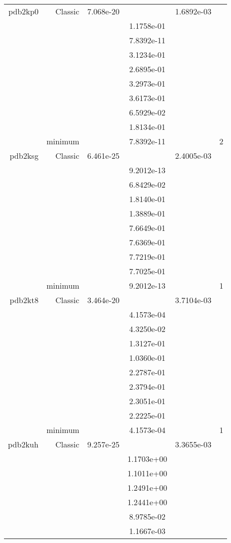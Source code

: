 \begin{xltabular}{\textwidth}{r|rS[table-format=1.3e+2]S[table-format=1.4e+2]S[table-format=1.4e+2]S[table-format=-1.5]}
pdb2kp0 & Classic & 7.068e-20 &  & 1.6892e-03 & \\
&  &  & 1.1758e-01 & & \\
&  &  & 7.8392e-11 & & \\
&  &  & 3.1234e-01 & & \\
&  &  & 2.6895e-01 & & \\
&  &  & 3.2973e-01 & & \\
&  &  & 3.6173e-01 & & \\
&  &  & 6.5929e-02 & & \\
&  &  & 1.8134e-01 & & \\
& minimum &  & 7.8392e-11 & & 2 \\  \addlinespace
pdb2ksg & Classic & 6.461e-25 &  & 2.4005e-03 & \\
&  &  & 9.2012e-13 & & \\
&  &  & 6.8429e-02 & & \\
&  &  & 1.8140e-01 & & \\
&  &  & 1.3889e-01 & & \\
&  &  & 7.6649e-01 & & \\
&  &  & 7.6369e-01 & & \\
&  &  & 7.7219e-01 & & \\
&  &  & 7.7025e-01 & & \\
& minimum &  & 9.2012e-13 & & 1 \\  \addlinespace
pdb2kt8 & Classic & 3.464e-20 &  & 3.7104e-03 & \\
&  &  & 4.1573e-04 & & \\
&  &  & 4.3250e-02 & & \\
&  &  & 1.3127e-01 & & \\
&  &  & 1.0360e-01 & & \\
&  &  & 2.2787e-01 & & \\
&  &  & 2.3794e-01 & & \\
&  &  & 2.3051e-01 & & \\
&  &  & 2.2225e-01 & & \\
& minimum &  & 4.1573e-04 & & 1 \\  \addlinespace
pdb2kuh & Classic & 9.257e-25 &  & 3.3655e-03 & \\
&  &  & 1.1703e+00 & & \\
&  &  & 1.1011e+00 & & \\
&  &  & 1.2491e+00 & & \\
&  &  & 1.2441e+00 & & \\
&  &  & 8.9785e-02 & & \\
&  &  & 1.1667e-03 & & \\

\end{xltabular}
